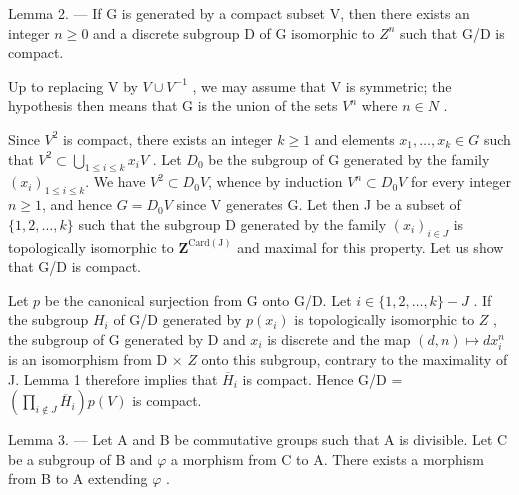 Lemma 2. --- If G is generated by a compact subset V, then there exists an integer \(n \geqslant 0\) and a discrete subgroup D of G isomorphic to \(Z^{n}\) such that G/D is compact.

Up to replacing V by \(V \cup V^{-1}\) , we may assume that V is symmetric; the hypothesis then means that G is the union of the sets \(V^{n}\) where \(n \in N\) .

Since \(V^{2}\) is compact, there exists an integer \(k \geqslant 1\) and elements \(x_{1}, \ldots, x_{k} \in G\) such that \(V^{2} \subset \bigcup_{1 \leqslant i \leqslant k} x_{i}V\) . Let \(D_{0}\) be the subgroup of G generated by the family \((x_{i})_{1 \leqslant i \leqslant k}\). We have \(V^{2} \subset D_{0}V\), whence by induction \(V^{n} \subset D_{0}V\) for every integer \(n \geqslant 1\), and hence \(G = D_{0}V\) since V generates G. Let then J be a subset of \(\{1, 2, \ldots, k\}\) such that the subgroup D generated by the family \((x_{i})_{i \in J}\) is topologically isomorphic to \(\mathbf{Z}^{\mathrm{Card(J)}}\) and maximal for this property. Let us show that G/D is compact.

Let \(p\) be the canonical surjection from G onto G/D. Let \(i \in \{1, 2, \ldots, k\} - J\) . If the subgroup \(H_i\) of G/D generated by \(p(x_i)\) is topologically isomorphic to \(Z\) , the subgroup of G generated by D and \(x_i\) is discrete and the map \((d, n) \mapsto dx_i^n\) is an isomorphism from D × \(Z\) onto this subgroup, contrary to the maximality of J. Lemma 1 therefore implies that \(\overline{H}_i\) is compact. Hence G/D = \((\prod_{i \not\in J} \overline{H}_i)p(V)\) is compact.

Lemma 3. — Let A and B be commutative groups such that A is divisible. Let C be a subgroup of B and \(\varphi\) a morphism from C to A. There exists a morphism from B to A extending \(\varphi\) .

